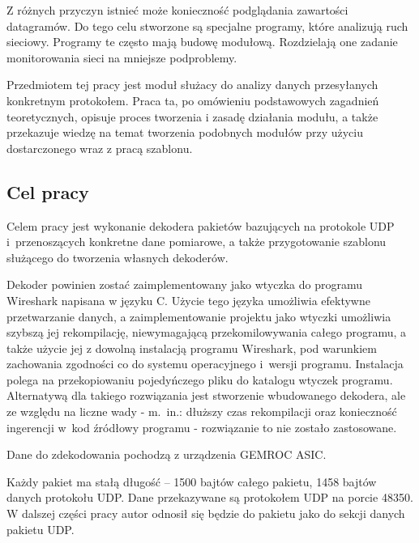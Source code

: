 \documentclass[a4paper, 11pt, twoside, openright]{article}
\begin{document}
Z różnych przyczyn istnieć może konieczność podglądania zawartości datagramów. Do tego celu stworzone są specjalne programy, które analizują ruch sieciowy.
Programy te często mają budowę modułową. Rozdzielają one zadanie monitorowania sieci na mniejsze podproblemy.

Przedmiotem tej pracy jest moduł służacy do analizy danych przesyłanych konkretnym protokołem. Praca ta, po omówieniu podstawowych zagadnień teoretycznych,
opisuje proces tworzenia i zasadę działania modułu, a także przekazuje wiedzę na temat tworzenia podobnych modułów przy użyciu dostarczonego wraz z pracą szablonu.

	\subsection{Cel pracy}

	\indent\par
	Celem pracy jest wykonanie dekodera pakietów bazujących na protokole UDP i~przenoszących konkretne dane pomiarowe, a także przygotowanie
	szablonu służącego do tworzenia własnych dekoderów.

	Dekoder powinien zostać zaimplementowany jako wtyczka do programu Wireshark napisana w języku C. Użycie tego języka umożliwia efektywne
	przetwarzanie danych, a zaimplementowanie projektu jako wtyczki umożliwia szybszą jej rekompilację,
	niewymagającą przekomilowywania całego programu, a także użycie jej z dowolną instalacją programu Wireshark,
	pod warunkiem zachowania zgodności co do systemu operacyjnego i~wersji programu. Instalacja polega na przekopiowaniu
	pojedyńczego pliku do katalogu wtyczek programu. Alternatywą dla takiego rozwiązania jest stworzenie wbudowanego dekodera,
	ale ze względu na liczne wady - m.~in.: dłuższy czas rekompilacji oraz konieczność ingerencji w~kod źródłowy programu - rozwiązanie
	to nie zostało zastosowane.

	Dane do zdekodowania pochodzą z urządzenia GEMROC ASIC.

	Każdy pakiet ma stałą długość -- 1500 bajtów całego pakietu, 1458 bajtów danych protokołu UDP.
	Dane przekazywane są protokołem UDP na porcie 48350.
	W dalszej części pracy autor odnosił się będzie do pakietu jako do sekcji danych pakietu UDP.
\end{document}
